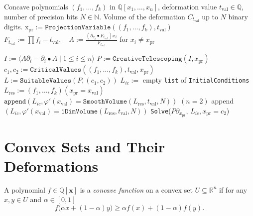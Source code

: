 \documentclass[sigconf, nonacm]{acmart} %
\newcommand{\pr}[0]{{\operatorname{pr}}}
\newcommand{\val}[0]{{\operatorname{val}}}
\begin{document}
\begin{algorithm}[ht]
    \caption{\texttt{SmoothVolume}} \label{alg:volume1}
    \begin{algorithmic} 
    \smallskip
        \Require Concave polynomials $(f_1,\ldots, f_k)$ in $\mathbb{Q}[x_1,\ldots, x_n]$, deformation value $t_{\val} \in \mathbb Q$, number of precision bits $N \in \mathbb N$.
        \Ensure Volume of the deformation $C_{t_\val}$ up to $N$ binary digits.
        \State $\operatorname{x_{\pr}} := \texttt{ProjectionVariable}((f_1,\ldots,f_k), t_{\val})$
        \State $F_{t_{\val}} := \prod f_i - t_{\val}, \quad A := \frac{(\partial_{x_i}\bullet F_{t_{\val}})x_i}{F_{t_{\val}}}$ for $x_i \neq x_\pr$ 

        \State $I := \langle A \partial_i - \partial_i \bullet A \mid 1 \leq i \leq n \rangle$
        \State $P := \texttt{CreativeTelescoping}(I, x_{\pr})$
        \State $c_1,c_2 := \texttt{CriticalValues}((f_1,\ldots, f_k), t_\val, x_{\pr})$
        \State $L := \texttt{SuitableValues}(P, (c_1,c_2))$
        \State $L_{ic}:=$ empty \texttt{list} of \texttt{InitialConditions} 
        \For{$x_{\val} \in L$}
            \State $L_{\operatorname{res}}:=(f_1,\ldots, f_k)(x_\pr = x_{\val})$
                \State $\texttt{append}(L_{ic}, \varphi'(x_{\val})=\texttt{SmoothVolume}(L_{ \operatorname{res}}, t_{\val},N))$
            \Else $(n=2)$
                \State append$(L_{ic}, \varphi'(x_{\val}) = \texttt{1DimVolume}(L_{\operatorname{res}}, t_\val, N))$
            \EndIf
        \EndFor  
        \State \Return 
        \texttt{Solve}($P\partial_{x_\pr}$, $L_{ic},x_\pr = c_2$)
    \end{algorithmic}
\end{algorithm}


\section{Convex Sets and Their Deformations}\label{sec:adaptation}


A polynomial $f \in \mathbb{Q}[\mathbf{x}]$ is a \textit{concave function} on a convex set $U \subseteq \mathbb R^n$ if for any $x, y \in U$ and $\alpha \in [0,1]$
\begin{equation}\label{eqdef:concave}
    f\big(\alpha x + (1 - \alpha)y\big) \geq \alpha f(x) + (1-\alpha)f(y).
\end{equation}
\end{document}

